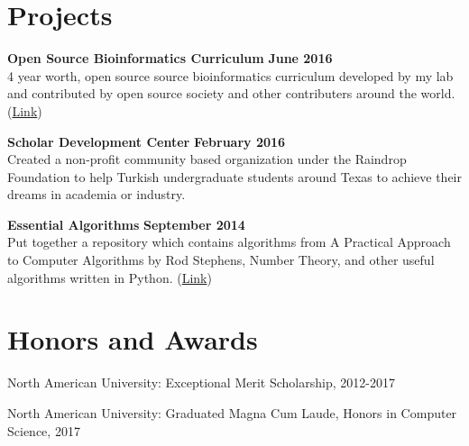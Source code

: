 \documentclass[margin,line]{res}
\begin{document}
\begin{resume}
%

%



\section{\sc Projects}
{\bf Open Source Bioinformatics Curriculum} \hfill {\bf June  2016}\\
4 year worth, open source source bioinformatics curriculum developed by my lab and contributed by open source society and other contributers around the world. (\href{https://github.com/open-source-society/bioinformatics}{Link})

{\bf Scholar Development Center} \hfill {\bf February  2016}\\
Created a non-profit community based organization under the Raindrop Foundation to help Turkish undergraduate students around Texas to achieve their dreams in academia or industry. 

{\bf Essential Algorithms} \hfill {\bf September 2014}\\
Put together a repository which contains algorithms from A Practical Approach to Computer Algorithms by Rod Stephens, Number Theory, and other useful algorithms written in Python. (\href{https://github.com/eneskemalergin/Essential_Algorithms}{Link})


\section{\sc Honors and Awards} 

North American University: Exceptional Merit Scholarship, 2012-2017

\vspace*{-2.5mm}
North American University: Graduated Magna Cum Laude, Honors in Computer Science, 2017


\end{resume}
\end{document}

